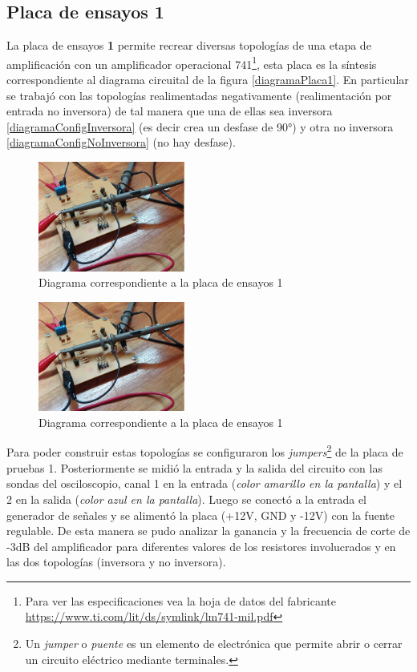 \documentclass[letterpaper, 10 pt, conference]{ieeeconf}  %
\begin{document}
\subsection{Placa de ensayos 1}
La placa de ensayos \textbf{1} permite recrear diversas topologías de una etapa de amplificación con un amplificador operacional 741\footnote{Para ver las especificaciones vea la hoja de datos del fabricante \href{https://www.ti.com/lit/ds/symlink/lm741-mil.pdf}{https://www.ti.com/lit/ds/symlink/lm741-mil.pdf}}, esta placa es la síntesis correspondiente al diagrama circuital de la figura \ref{diagramaPlaca1}. En particular se trabajó con las topologías realimentadas negativamente (realimentación por entrada no inversora) de tal manera que una de ellas sea inversora \ref{diagramaConfigInversora} (es decir crea un desfase de 90°) y otra no inversora \ref{diagramaConfigNoInversora} (no hay desfase).
\begin{figure}[H]
  \centering
  \includegraphics[width=0.43\textwidth]{./placaDePruebas1.jpg}
  \caption{Diagrama correspondiente a la placa de ensayos 1}
  \label{placaDePruebas1}
\end{figure}
\begin{figure}[H]
  \centering
  \includegraphics[width=0.43\textwidth]{./placaDePruebas2.jpg}
  \caption{Diagrama correspondiente a la placa de ensayos 1}
  \label{placaDePruebas2}
\end{figure}

Para poder construir estas topologías se configuraron los \textit{jumpers}\footnote{Un \textit{jumper} o \textit{puente} es un elemento de electrónica que permite abrir o cerrar un circuito eléctrico mediante terminales.} de la placa de pruebas 1. Posteriormente se midió la entrada y la salida del circuito con las sondas del osciloscopio, canal 1 en la entrada (\textit{color amarillo en la pantalla}) y el 2 en la salida (\textit{color azul en la pantalla}). Luego se conectó a la entrada el generador de señales y se alimentó la placa (+12V, GND y -12V) con la fuente regulable. De esta manera se pudo analizar la ganancia y la frecuencia de corte de -3dB del amplificador para diferentes valores de los resistores involucrados y en las dos topologías (inversora y no inversora).
\end{document}
